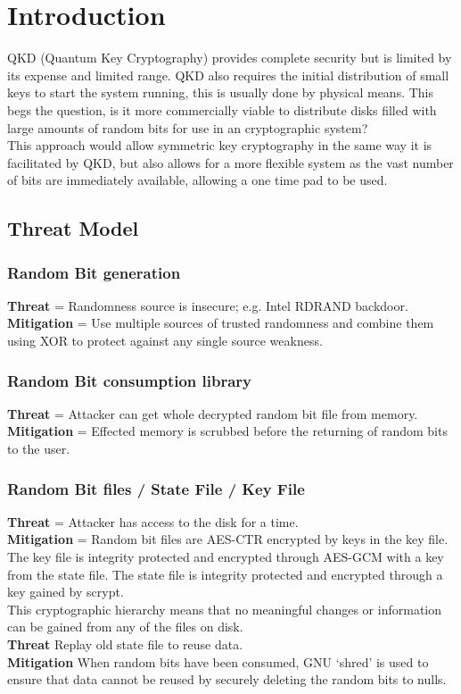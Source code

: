 \documentclass{paper}
\author{Dan Horbury, }
\begin{document}
	\maketitle
	\section{Introduction}
		QKD (Quantum Key Cryptography) provides complete security but is limited by its expense and limited range. QKD also requires the initial distribution of small keys to start the system running, this is usually done by physical means. This begs the question, is it more commercially viable to distribute disks filled with large amounts of random bits for use in an cryptographic system?\\
		This approach would allow symmetric key cryptography in the same way it is facilitated by QKD, but also allows for a more flexible system as the vast number of bits are immediately available, allowing a one time pad to be used.\\
	\subsection{Threat Model}
		\subsubsection{Random Bit generation}
			\textbf{Threat} = Randomness source is insecure; e.g. Intel RDRAND backdoor.\\
			\textbf{Mitigation} = Use multiple sources of trusted randomness and combine them using XOR to protect against any single source weakness.
		\subsubsection{Random Bit consumption library}
			\textbf{Threat} = Attacker can get whole decrypted random bit file from memory.\\
			\textbf{Mitigation} = Effected memory is scrubbed before the returning of random bits to the user.
		\subsubsection{Random Bit files / State File / Key File}
			\textbf{Threat} = Attacker has access to the disk for a time.\\
			\textbf{Mitigation} = Random bit files are AES-CTR encrypted by keys in the key file. The key file is integrity protected and encrypted through AES-GCM with a key from the state file. The state file is integrity protected and encrypted through a key gained by scrypt. \\
			This cryptographic hierarchy means that no meaningful changes or information can be gained from any of the files on disk.\\
			\textbf{Threat} Replay old state file to reuse data.\\
			\textbf{Mitigation} When random bits have been consumed, GNU `shred' is used to ensure that data cannot be reused by securely deleting the random bits to nulls.\\
	
\end{document}

